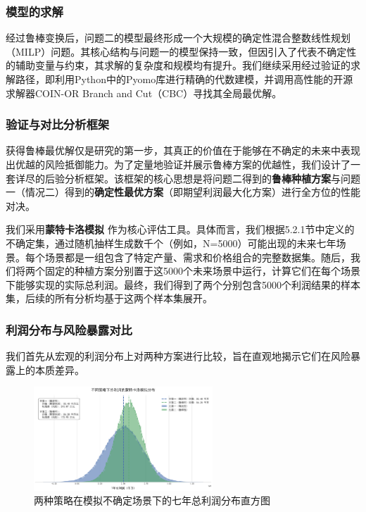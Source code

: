 \documentclass[withoutpreface,bwprint]{cumcmthesis} %
\begin{document}
\subsubsection{模型的求解}

经过鲁棒变换后，问题二的模型最终形成一个大规模的确定性混合整数线性规划（MILP）问题。其核心结构与问题一的模型保持一致，但因引入了代表不确定性的辅助变量与约束，其求解的复杂度和规模均有提升。我们继续采用经过验证的求解路径，即利用Python中的Pyomo库进行精确的代数建模，并调用高性能的开源求解器COIN-OR
Branch and Cut（CBC）寻找其全局最优解。

\subsubsection{验证与对比分析框架}

获得鲁棒最优解仅是研究的第一步，其真正的价值在于能够在不确定的未来中表现出优越的风险抵御能力。为了定量地验证并展示鲁棒方案的优越性，我们设计了一套详尽的后验分析框架。该框架的核心思想是将问题二得到的\textbf{鲁棒种植方案}与问题一（情况二）得到的\textbf{确定性最优方案}（即期望利润最大化方案）进行全方位的性能对决。

我们采用\textbf{蒙特卡洛模拟}
作为核心评估工具。具体而言，我们根据5.2.1节中定义的不确定集，通过随机抽样生成数千个（例如，N=5000）可能出现的未来七年场景。每个场景都是一组包含了特定产量、需求和价格组合的完整数据集。随后，我们将两个固定的种植方案分别置于这5000个未来场景中运行，计算它们在每个场景下能够实现的实际总利润。最终，我们得到了两个分别包含5000个利润结果的样本集，后续的所有分析均基于这两个样本集展开。

\subsubsection{利润分布与风险暴露对比}

我们首先从宏观的利润分布上对两种方案进行比较，旨在直观地揭示它们在风险暴露上的本质差异。


\begin{figure}[htbp]
    \centering
    \includegraphics[width=0.6\textwidth]{figures/2_1.png}
    \caption{两种策略在模拟不确定场景下的七年总利润分布直方图}
    \label{fig:2_1}
\end{figure}
\end{document}
